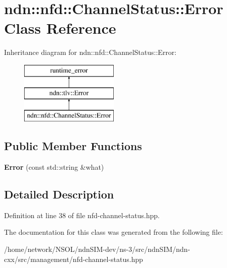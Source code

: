 \hypertarget{classndn_1_1nfd_1_1ChannelStatus_1_1Error}{}\section{ndn\+:\+:nfd\+:\+:Channel\+Status\+:\+:Error Class Reference}
\label{classndn_1_1nfd_1_1ChannelStatus_1_1Error}
Inheritance diagram for ndn\+:\+:nfd\+:\+:Channel\+Status\+:\+:Error\+:\begin{figure}[H]
\begin{center}
\leavevmode
\includegraphics[height=3.000000cm]{classndn_1_1nfd_1_1ChannelStatus_1_1Error}
\end{center}
\end{figure}
\subsection*{Public Member Functions}
\begin{DoxyCompactItemize}
\item 
{\bfseries Error} (const std\+::string \&what)\hypertarget{classndn_1_1nfd_1_1ChannelStatus_1_1Error_a2d3c0b88be62e3c0c8daddb5a034935d}{}\label{classndn_1_1nfd_1_1ChannelStatus_1_1Error_a2d3c0b88be62e3c0c8daddb5a034935d}

\end{DoxyCompactItemize}


\subsection{Detailed Description}


Definition at line 38 of file nfd-\/channel-\/status.\+hpp.



The documentation for this class was generated from the following file\+:\begin{DoxyCompactItemize}
\item 
/home/network/\+N\+S\+O\+L/ndn\+S\+I\+M-\/dev/ns-\/3/src/ndn\+S\+I\+M/ndn-\/cxx/src/management/nfd-\/channel-\/status.\+hpp\end{DoxyCompactItemize}
